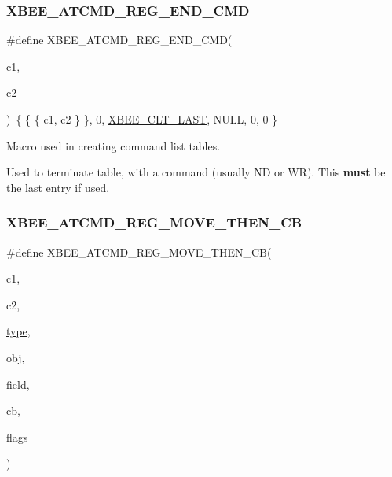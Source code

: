 \subsubsection{\texorpdfstring{X\+B\+E\+E\+\_\+\+A\+T\+C\+M\+D\+\_\+\+R\+E\+G\+\_\+\+E\+N\+D\+\_\+\+C\+MD}{XBEE\_ATCMD\_REG\_END\_CMD}}
{\footnotesize\ttfamily \#define X\+B\+E\+E\+\_\+\+A\+T\+C\+M\+D\+\_\+\+R\+E\+G\+\_\+\+E\+N\+D\+\_\+\+C\+MD(\begin{DoxyParamCaption}\item[{}]{c1,  }\item[{}]{c2 }\end{DoxyParamCaption})~\{ \{ \{ c1, c2 \} \}, 0, \hyperlink{group__xbee__atcmd_gga1bd8ecd38c107579d20ded3c79a7d70ba6e78c45780bccbc7226af34868dc567f}{X\+B\+E\+E\+\_\+\+C\+L\+T\+\_\+\+L\+A\+ST}, N\+U\+LL, 0, 0 \}}



Macro used in creating command list tables. 

Used to terminate table, with a command (usually ND or WR). This {\bfseries must} be the last entry if used. \mbox{\label{group__xbee__atcmd_gaf5f12cd2d94f9f4ecf0a679196a6ed21}} 
\subsubsection{\texorpdfstring{X\+B\+E\+E\+\_\+\+A\+T\+C\+M\+D\+\_\+\+R\+E\+G\+\_\+\+M\+O\+V\+E\+\_\+\+T\+H\+E\+N\+\_\+\+CB}{XBEE\_ATCMD\_REG\_MOVE\_THEN\_CB}}
{\footnotesize\ttfamily \#define X\+B\+E\+E\+\_\+\+A\+T\+C\+M\+D\+\_\+\+R\+E\+G\+\_\+\+M\+O\+V\+E\+\_\+\+T\+H\+E\+N\+\_\+\+CB(\begin{DoxyParamCaption}\item[{}]{c1,  }\item[{}]{c2,  }\item[{}]{\hyperlink{group__zcl_ga1d127017fb298b889f4ba24752d08b8e}{type},  }\item[{}]{obj,  }\item[{}]{field,  }\item[{}]{cb,  }\item[{}]{flags }\end{DoxyParamCaption})}

